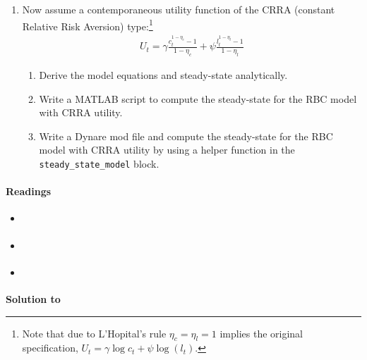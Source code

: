 \begin{enumerate}
\item Now assume a contemporaneous utility function of the CRRA (constant Relative Risk Aversion) type:\footnote{
    Note that due to L'Hopital's rule $\eta_c=\eta_l=1$ implies the original specification, $U_t=\gamma \log c_t + \psi \log(l_t)$.}
\begin{align*}
    U_t = \gamma \frac{c_{t}^{1-\eta_c}-1}{1-\eta_c} + \psi \frac{l_{t}^{1-\eta_l}-1}{1-\eta_l}
\end{align*}
\begin{enumerate}
    \item Derive the model equations and steady-state analytically.
    \item Write a MATLAB script to compute the steady-state for the RBC model with CRRA utility.
    \item Write a Dynare mod file and compute the steady-state for the RBC model with CRRA utility by using a helper function in the \texttt{steady\_state\_model} block.
\end{enumerate}

\end{enumerate}

\paragraph{Readings}
\begin{itemize}
  \item \textcite{King.Rebelo_1999_ResuscitatingRealBusiness}
  \item \textcite[Ch.~5]{Romer_2019_AdvancedMacroeconomics}
  \item \textcite[Ch.~1, Ch.~2]{Torres_2013_IntroductionDynamicMacroeconomic}
\end{itemize}

\begin{solution}\textbf{Solution to }
\ifDisplaySolutions

\fi
\newpage
\end{solution}